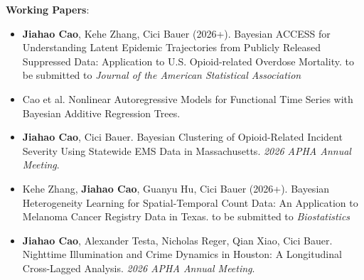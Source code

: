 \documentclass[letterpaper,11pt]{article}
\begin{document}
\textbf{Working Papers}:

\begin{itemize}
    \item \textbf{Jiahao Cao}, Kehe Zhang, Cici Bauer (2026+). Bayesian ACCESS for Understanding Latent Epidemic Trajectories from Publicly Released Suppressed Data: Application to U.S. Opioid-related Overdose Mortality. to be submitted to \textit{Journal of the American Statistical Association}
    \item Cao et al. Nonlinear Autoregressive Models for Functional Time Series with Bayesian Additive Regression Trees. 
    \item \textbf{Jiahao Cao}, Cici Bauer. Bayesian Clustering of Opioid-Related Incident Severity Using Statewide EMS Data in Massachusetts. \textit{2026 APHA Annual Meeting}.
    \item Kehe Zhang, \textbf{Jiahao Cao}, Guanyu Hu, Cici Bauer (2026+). Bayesian Heterogeneity Learning for Spatial-Temporal Count Data: An Application to Melanoma Cancer Registry Data in Texas. to be submitted to \textit{Biostatistics}
    \item \textbf{Jiahao Cao}, Alexander Testa, Nicholas Reger, Qian Xiao, Cici Bauer. Nighttime Illumination and Crime Dynamics in Houston: A Longitudinal Cross-Lagged Analysis. \textit{2026 APHA Annual Meeting}.
\end{itemize}






\end{document}
